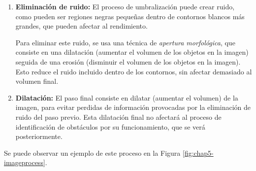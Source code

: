 \begin{enumerate}
	\item \textbf{Eliminación de ruido:} El proceso de umbralización puede crear ruido, como pueden ser regiones negras pequeñas dentro de contornos blancos más grandes, que pueden afectar al rendimiento.
	
	Para eliminar este ruido, se usa una técnica de \textit{apertura morfológica}, que consiste en una dilatación (aumentar el volumen de los objetos en la imagen) seguida de una erosión (disminuir el volumen de los objetos en la imagen). Esto reduce el ruido incluido dentro de los contornos, sin afectar demasiado al volumen final.
	
	\item \textbf{Dilatación:} El paso final consiste en dilatar (aumentar el volumen) de la imagen, para evitar perdidas de información provocadas por la eliminación de ruido del paso previo. Esta dilatación final no afectará al proceso de identificación de obstáculos por su funcionamiento, que se verá posteriormente.
\end{enumerate}

Se puede observar un ejemplo de este proceso en la Figura \ref{fig:chap5-imageprocess}.

